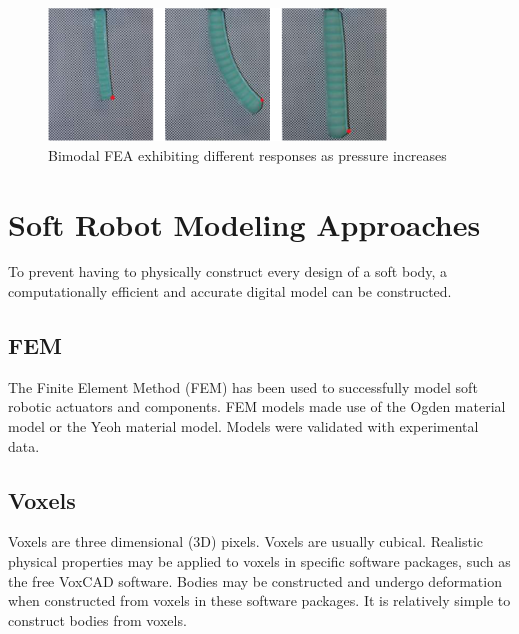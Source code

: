 \begin{figure}[H]
	\centering
	\includegraphics[width=0.8\textwidth]{BimodalActuator.png}
	\caption{Bimodal FEA exhibiting different responses as pressure increases \citep{Ellis2020}}
	\label{fig:bifea}
\end{figure}

\section{Soft Robot Modeling Approaches}

To prevent having to physically construct every design of a soft body, a computationally efficient and accurate digital model can be constructed.

\subsection{FEM}

The Finite Element Method (FEM) has been used to successfully model soft robotic actuators and components. FEM models made use of the Ogden material model or the Yeoh material model. Models were validated with experimental data. \citep{Elsayed2014, Runge2017}

\subsection{Voxels}

Voxels are three dimensional (3D) pixels. Voxels are usually cubical. Realistic physical properties may be applied to voxels in specific software packages, such as the free VoxCAD software. Bodies may be constructed and undergo deformation when constructed from voxels in these software packages. It is relatively simple to construct bodies from voxels. \citep{Cheney2013,Cheney2015}

